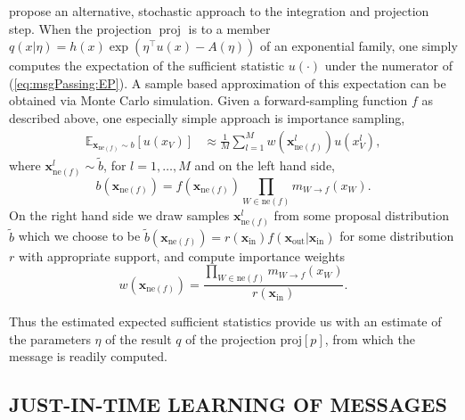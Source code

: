 \documentclass[english]{article}
\theoremstyle{plain}
\theoremstyle{plain}
\newcommand{\factor}{f}				%
\newcommand{\outV}{V}                         %
\newcommand{\fis}[1]{\mathrm{ne}(#1)}   	%
\newcommand{\fx}[1]{ \mathbf{x}_{\mathrm{ne}(#1)} }   	%
\newcommand{\xin}{\mathbf{x}_{ \mathrm{in} }} 			%
\newcommand{\xout}{\mathbf{x}_{ \mathrm{out} }}			%
\newcommand{\msg}[2]{m_{#1 \rightarrow #2}}			%
\newcommand{\projP}[1]{\mathrm{proj} \left [ #1 \right]}
\DeclareMathOperator*{\proj}{\text{proj}} %
\newcommand{\expectationE}[2]{ \mathbb{E}_{#2}  \left[ #1 \right] }
\newcommand{\wjnote}[1]{ }
\newcommand{\dsnote}[1]{}%
\begin{document}
\citet{Barthelme2011,Heess2013,Eslami2014} propose an alternative, stochastic approach to the integration and projection step.
When the projection $\proj$ is to a member $q(x|\eta)=h(x)\exp\left(\eta^{\top}u(x)-A(\eta)\right)$ of an exponential family, one simply computes the expectation of the sufficient statistic $u(\cdot)$ under the numerator of (\ref{eq:msgPassing:EP}).
A sample based approximation of this expectation can be obtained via Monte Carlo simulation.   %
Given a forward-sampling function $f$ as described above, one especially simple approach is importance sampling, 
\begin{align}
\expectationE{u(x_{\outV})}{\fx{\factor}\sim b }
&\approx \frac{1}{M} \sum_{l=1}^M w(\fx{\factor}^l) u(x_{\outV}^l),
\label{eq:msgIS}
\end{align}
where $\fx{\factor}^l \sim \tilde{b}$, for $l=1,\ldots,M$ and on the left hand side, 
%
\begin{equation*}
b(\fx{\factor}) = \factor (\fx{\factor}) \prod_{W \in \fis{\factor}} \msg{W}{\factor}(x_{W}). 
\end{equation*}
On the right hand side we draw samples $\fx{\factor}^l$ from some proposal distribution $\tilde{b}$ which we choose to be 
%
$\tilde{b}(\fx{\factor}) = r(\xin)\factor(\xout | \xin)$
%
for some distribution $r$ with appropriate support, and compute importance weights 
\begin{equation*}
w(\fx{\factor}) = \frac{\prod_{W \in \fis{\factor}} \msg{W}{\factor}(x_{W})}{r(\xin)}.
\end{equation*}

Thus the estimated expected sufficient statistics provide us with an estimate of the parameters $\eta$ of the result $q$ of the projection $\projP{p}$, from which the message is readily computed.\dsnote{isn't $\eta$ the actual message?}



\subsection{JUST-IN-TIME LEARNING OF MESSAGES}
\label{sec:EP:JIT}
\end{document}
